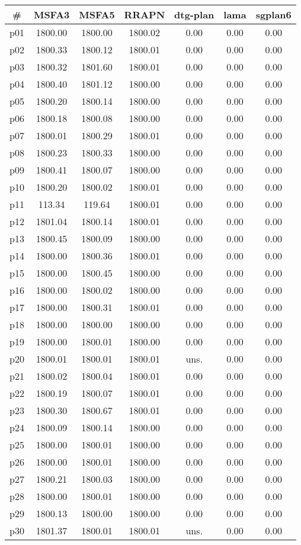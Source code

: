 \begin{tabular}{ccccccc}
\toprule
\textbf{\#} & \textbf{MSFA3} & \textbf{MSFA5} & \textbf{RRAPN} & \textbf{dtg-plan} & \textbf{lama} & \textbf{sgplan6}\\
\midrule
p01 & 1800.00 & 1800.00 & 1800.02 & 0.00 & 0.00 & 0.00\\
p02 & 1800.33 & 1800.12 & 1800.01 & 0.00 & 0.00 & 0.00\\
p03 & 1800.32 & 1801.60 & 1800.01 & 0.00 & 0.00 & 0.00\\
p04 & 1800.40 & 1801.12 & 1800.00 & 0.00 & 0.00 & 0.00\\
p05 & 1800.20 & 1800.14 & 1800.00 & 0.00 & 0.00 & 0.00\\
p06 & 1800.18 & 1800.08 & 1800.00 & 0.00 & 0.00 & 0.00\\
p07 & 1800.01 & 1800.29 & 1800.01 & 0.00 & 0.00 & 0.00\\
p08 & 1800.23 & 1800.33 & 1800.00 & 0.00 & 0.00 & 0.00\\
p09 & 1800.41 & 1800.07 & 1800.00 & 0.00 & 0.00 & 0.00\\
p10 & 1800.20 & 1800.02 & 1800.01 & 0.00 & 0.00 & 0.00\\
p11 & 113.34 & 119.64 & 1800.01 & 0.00 & 0.00 & 0.00\\
p12 & 1801.04 & 1800.14 & 1800.01 & 0.00 & 0.00 & 0.00\\
p13 & 1800.45 & 1800.09 & 1800.00 & 0.00 & 0.00 & 0.00\\
p14 & 1800.00 & 1800.36 & 1800.01 & 0.00 & 0.00 & 0.00\\
p15 & 1800.00 & 1800.45 & 1800.00 & 0.00 & 0.00 & 0.00\\
p16 & 1800.00 & 1800.02 & 1800.00 & 0.00 & 0.00 & 0.00\\
p17 & 1800.00 & 1800.31 & 1800.01 & 0.00 & 0.00 & 0.00\\
p18 & 1800.00 & 1800.00 & 1800.00 & 0.00 & 0.00 & 0.00\\
p19 & 1800.00 & 1800.01 & 1800.00 & 0.00 & 0.00 & 0.00\\
p20 & 1800.01 & 1800.01 & 1800.01 & uns. & 0.00 & 0.00\\
p21 & 1800.02 & 1800.04 & 1800.01 & 0.00 & 0.00 & 0.00\\
p22 & 1800.19 & 1800.07 & 1800.01 & 0.00 & 0.00 & 0.00\\
p23 & 1800.30 & 1800.67 & 1800.01 & 0.00 & 0.00 & 0.00\\
p24 & 1800.09 & 1800.14 & 1800.00 & 0.00 & 0.00 & 0.00\\
p25 & 1800.00 & 1800.01 & 1800.00 & 0.00 & 0.00 & 0.00\\
p26 & 1800.00 & 1800.01 & 1800.00 & 0.00 & 0.00 & 0.00\\
p27 & 1800.21 & 1800.03 & 1800.00 & 0.00 & 0.00 & 0.00\\
p28 & 1800.00 & 1800.01 & 1800.00 & 0.00 & 0.00 & 0.00\\
p29 & 1800.13 & 1800.00 & 1800.00 & 0.00 & 0.00 & 0.00\\
p30 & 1801.37 & 1800.01 & 1800.01 & uns. & 0.00 & 0.00\\
\bottomrule
\end{tabular}

